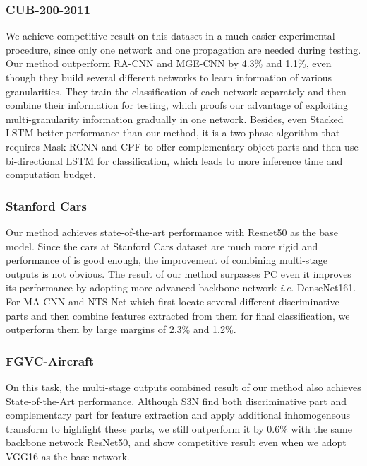 \documentclass{llncs}
\begin{document}
\subsubsection{CUB-200-2011}



We achieve competitive result on this dataset in a much easier experimental procedure, since only one network and one propagation are needed during testing. Our method outperform RA-CNN\cite{fu2017look} and MGE-CNN \cite{zhang2019learning} by 4.3\% and 1.1\%, even though they build several different networks to learn information of various granularities. They train the classification of each network separately and then combine their information for testing, which proofs our advantage of exploiting multi-granularity information gradually in one network. Besides, even Stacked LSTM \cite{ge2019weakly} better performance than our method, it is a two phase algorithm that requires Mask-RCNN \cite{he2017mask} and CPF to offer complementary object parts and then use bi-directional LSTM \cite{hochreiter1997long} for classification, which leads to more inference time and computation budget.

\subsubsection{Stanford Cars}


Our method achieves state-of-the-art performance with Resnet50 as the base model. Since the cars at Stanford Cars dataset are much more rigid and performance of  is good enough, the improvement of combining multi-stage outputs is not obvious. The result of our method surpasses PC \cite{dubey2018pairwise} even it improves its performance by adopting more advanced backbone network {\em i.e.} DenseNet161. For MA-CNN \cite{zheng2017learning} and NTS-Net \cite{yang2018learning} which first locate several different discriminative parts and then combine features extracted from them for final classification, we outperform them by large margins of 2.3\% and 1.2\%.

\subsubsection{FGVC-Aircraft}


On this task, the multi-stage outputs combined result of our method also achieves State-of-the-Art performance. Although S3N \cite{ding2019selective} find both discriminative part and complementary part for feature extraction and apply additional inhomogeneous transform to highlight these parts, we still outperform it by 0.6\% with the same backbone network ResNet50, and show competitive result even when we adopt VGG16 as the base network.
\end{document}
